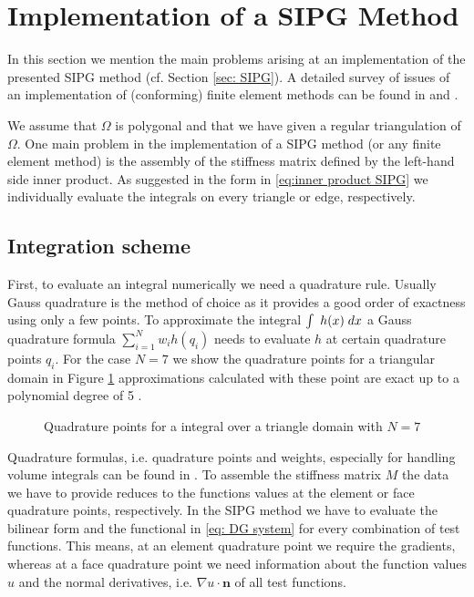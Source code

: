 \section{Implementation of a SIPG Method}

In this section we mention the main problems arising at an implementation of the presented SIPG method (cf. Section \ref{sec: SIPG}). A detailed survey of issues of an implementation of (conforming) finite element methods can be found in \cite[Section 0.6]{BS2002} and \cite[Chapter 8]{Braess2003}. 

We assume that $\Omega$ is polygonal and that we have given a regular triangulation of $\Omega$. One main problem in the implementation of a SIPG method (or any finite element method) is the assembly of the stiffness matrix defined by the left-hand side inner product. As suggested in the form in \eqref{eq:inner product SIPG} we individually evaluate the integrals on every triangle or edge, respectively. %

\subsection{Integration scheme}
First, to evaluate an integral numerically we need a quadrature rule. Usually Gauss quadrature is the method of choice as it provides a good order of exactness using only a few points. To approximate the integral $\int_{\phantom{x}} {{h(x)}\;dx} $ a Gauss quadrature formula $\sum_{i=1}^{N} w_i h(q_i)$ needs to evaluate $h$ at certain quadrature points $q_i$. For the case $N=7$ we show the quadrature points for a triangular domain in Figure \ref{fig: quadrature} approximations calculated with these point are exact up to a polynomial degree of 5 \cite[p.314]{Strout1971}.
\begin{figure}[H]
	\centering
	
	\caption{Quadrature points for a integral over a triangle domain with $N=7$}
	 \label{fig: quadrature}
\end{figure}
Quadrature formulas, i.e. quadrature points and weights, especially for handling volume integrals can be found in \cite{Strout1971}.
To assemble the stiffness matrix $M$ the data we have to provide reduces to the functions values at the element or face quadrature points, respectively.  
In the SIPG method we have to evaluate the bilinear form and the functional in \eqref{eq: DG system} for every combination of test functions. This means, at an element quadrature point we require the gradients, whereas at a face quadrature point we need information about the function values $u$ and the normal derivatives, i.e. $\nabla u \cdot \mathbf{n}$ of all test functions.

